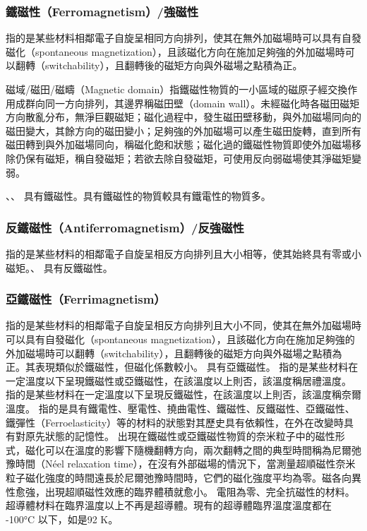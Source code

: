 \documentclass[a4paper,12pt]{report}
\begin{document}
\begin{itemize}
\subsubsection{鐵磁性（Ferromagnetism）/強磁性}
指的是某些材料相鄰電子自旋呈相同方向排列，使其在無外加磁場時可以具有自發磁化（spontaneous magnetization），且該磁化方向在施加足夠強的外加磁場時可以翻轉（switchability），且翻轉後的磁矩方向與外磁場之點積為正。

磁域/磁田/磁疇（Magnetic domain）指鐵磁性物質的一小區域的磁原子經交換作用成群向同一方向排列，其邊界稱磁田壁（domain wall）。未經磁化時各磁田磁矩方向散亂分布，無淨巨觀磁矩；磁化過程中，發生磁田壁移動，與外加磁場同向的磁田變大，其餘方向的磁田變小；足夠強的外加磁場可以產生磁田旋轉，直到所有磁田轉到與外加磁場同向，稱磁化飽和狀態；磁化過的鐵磁性物質即使外加磁場移除仍保有磁矩，稱自發磁矩；若欲去除自發磁矩，可使用反向弱磁場使其淨磁矩變弱。

、、 具有鐵磁性。具有鐵磁性的物質較具有鐵電性的物質多。
\subsubsection{反鐵磁性（Antiferromagnetism）/反強磁性}
指的是某些材料的相鄰電子自旋呈相反方向排列且大小相等，使其始終具有零或小磁矩。、 具有反鐵磁性。
\subsubsection{亞鐵磁性（Ferrimagnetism）}
指的是某些材料的相鄰電子自旋呈相反方向排列且大小不同，使其在無外加磁場時可以具有自發磁化（spontaneous magnetization），且該磁化方向在施加足夠強的外加磁場時可以翻轉（switchability），且翻轉後的磁矩方向與外磁場之點積為正。其表現類似於鐵磁性，但磁化係數較小。 具有亞鐵磁性。
指的是某些材料在一定溫度以下呈現鐵磁性或亞鐵磁性，在該溫度以上則否，該溫度稱居禮溫度。
指的是某些材料在一定溫度以下呈現反鐵磁性，在該溫度以上則否，該溫度稱奈爾溫度。
指的是具有鐵電性、壓電性、撓曲電性、鐵磁性、反鐵磁性、亞鐵磁性、鐵彈性（Ferroelasticity）等的材料的狀態對其歷史具有依賴性，在外在改變時具有對原先狀態的記憶性。
出現在鐵磁性或亞鐵磁性物質的奈米粒子中的磁性形式，磁化可以在溫度的影響下隨機翻轉方向，兩次翻轉之間的典型時間稱為尼爾弛豫時間（Néel relaxation time），在沒有外部磁場的情況下，當測量超順磁性奈米粒子磁化強度的時間遠長於尼爾弛豫時間時，它們的磁化強度平均為零。磁各向異性愈強，出現超順磁性效應的臨界體積就愈小。
電阻為零、完全抗磁性的材料。
超導體材料在臨界溫度以上不再是超導體。現有的超導體臨界溫度溫度都在 -100°C 以下，如是92 K。



\end{itemize}
\end{document}
